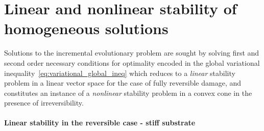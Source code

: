 \section{Linear and nonlinear stability {of homogeneous solutions}}
\label{sec:stability}

Solutions to the incremental evolutionary problem are sought by solving first and second order necessary conditions for optimality encoded in the global variational inequality~\eqref{eq:variational_global_ineq} which reduces to a \emph{linear} stability problem in a linear vector space for the case of fully reversible damage, and constitutes an instance of a \emph{nonlinear} stability problem in a convex cone in the presence of irreversibility.

\paragraph{Linear stability in the reversible case - stiff substrate}

